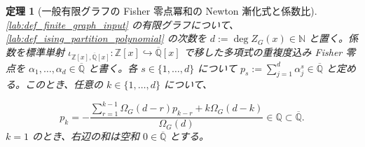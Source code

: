 \documentclass[11pt,a4paper]{article}
\newtheorem{theorem}[definition]{定理}
\theoremstyle{remark}
\begin{document}
\begin{theorem}[一般有限グラフの Fisher 零点冪和の Newton 漸化式と係数比]\label{lab:theorem_fisher_zero_power_sum_newton_recurrence}
\cref{lab:def_finite_graph_input}
 の有限グラフについて、
\cref{lab:def_ising_partition_polynomial}
 の次数を 
$d:=\deg Z_G(x)\in\mathbb N$
 と置く。係数を標準単射 
$\iota_{\mathbb Z[x],\overline{\mathbb Q}[x]}:\mathbb Z[x]\hookrightarrow\overline{\mathbb Q}[x]$
 で移した多項式の重複度込み Fisher 零点を 
$\alpha_1,\ldots,\alpha_d\in\overline{\mathbb Q}$
 と書く。各 
$s\in\{1,\ldots,d\}$
 について 
$p_s:=\sum_{j=1}^{d}\alpha_j^s\in\overline{\mathbb Q}$
 と定める。このとき、任意の 
$k\in\{1,\ldots,d\}$
 について、

\[p_k
=
-\frac{
  \displaystyle
  \sum_{r=1}^{k-1}\Omega_G(d-r)p_{k-r}
  +k\Omega_G(d-k)
}{
  \Omega_G(d)
}
\in\mathbb Q
\subset\overline{\mathbb Q}.\]
$k=1$
 のとき、右辺の和は空和 
$0\in\overline{\mathbb Q}$
 とする。

\end{theorem}
\end{document}
